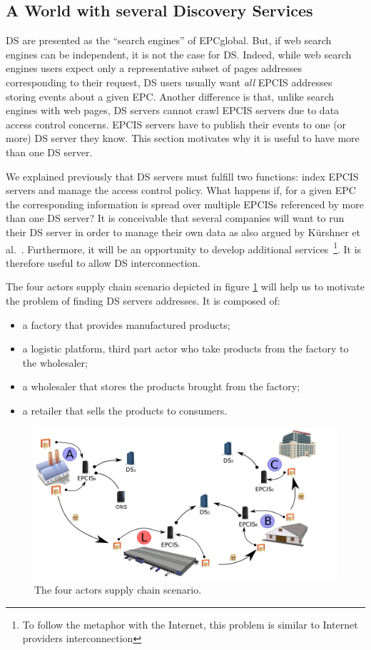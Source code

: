 \documentclass[a4paper]{llncs}
\begin{document}
\subsection{A World with several Discovery Services}

DS are presented as the ``search engines'' of EPCglobal. But, if web search engines can be
independent, it is not the case for DS. Indeed, while web search engines users expect only a
representative subset of pages addresses corresponding to their request, DS users usually want
\emph{all} EPCIS addresses storing events about a given EPC. Another difference is that, unlike
search engines with web pages, DS servers cannot crawl EPCIS servers due to data access control
concerns. EPCIS servers have to publish their events to one (or more) DS server they know. This
section motivates why it is useful to have more than one DS server.

We explained previously that DS servers must fulfill two functions: index EPCIS servers and manage
the access control policy. What happens if, for a given EPC the corresponding information is spread
over multiple EPCISs referenced by more than one DS server? It is conceivable that several companies
will want to run their DS server in order to manage their own data as also argued by K\"urshner et
al.~\cite{dsdesign}. Furthermore, it will be an opportunity to develop additional
services~\footnote{To follow the metaphor with the Internet, this problem is similar to Internet
providers interconnection}. It is therefore useful to allow DS interconnection.

The four actors supply chain scenario depicted in figure \ref{scenario} will help us to motivate the
problem 
of finding DS servers addresses. It is composed of:
\begin{itemize}
\item a factory that provides manufactured products;
\item a logistic platform, third part actor who take products from the factory to the wholesaler;
\item a wholesaler that stores the products brought from the factory;
\item a retailer that sells the products to consumers.
\end{itemize}

\begin{figure}[htb]
\centering
\includegraphics[width=.8\textwidth]{img/scenario2.png}
\caption{The four actors supply chain scenario.}
\label{scenario}
\end{figure}
\end{document}
